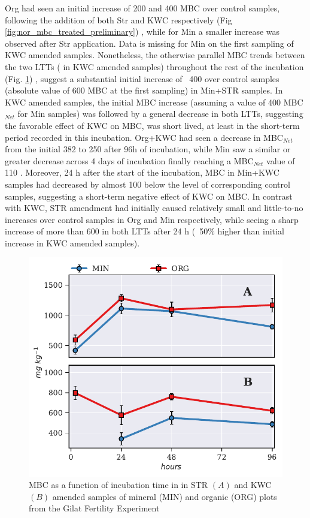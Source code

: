             \noindent Org had seen an initial increase of 200 and 400 \genericunit MBC over control samples, following the addition of both Str and KWC respectively (Fig \ref{fig:nor_mbc_treated_preliminary}) , while for Min a smaller increase was observed after Str application. Data is missing for Min on the first sampling of KWC  amended samples. Nonetheless, the otherwise parallel MBC trends between the two LTTs ( in KWC amended samples) throughout the rest of the incubation (Fig. \ref{fig:mbc_treated_preliminary}) , suggest a substantial initial increase of ~400 \genericunit over control samples (absolute value of 600 \genericunit MBC at the first sampling)  in Min+STR samples.
            In KWC amended samples, the initial MBC increase (assuming a value of 400 \genericunit MBC$_{Net}$ for Min samples) was followed by a general decrease in both LTTs, suggesting the favorable effect of KWC on MBC,  was short lived, at least in the short-term period recorded in this incubation. Org+KWC had seen a decrease in MBC$_{Net}$ from the initial 382 to 250 \genericunit after 96h of incubation, while Min saw a similar or greater decrease across 4 days of incubation finally reaching a MBC$_{Net}$ value of  110 \genericunit. Moreover, 24 h after the start of the incubation, MBC in Min+KWC samples had decreased by almost 100 \genericunit below the level of corresponding control samples,  suggesting a short-term negative effect of KWC on MBC. In contrast with KWC, STR amendment had initially caused relatively small and little-to-no increases over control samples in Org and Min respectively, while seeing a sharp increase of more than 600 \genericunit in both LTTs after 24 h (~50$\%$ higher than initial increase in KWC amended samples).\\

			\begin{figure}[H]
				\centering
				\includegraphics[width=\linewidth]{thesis_figures/preliminary/treated/MBC.pdf}
				\caption{MBC  as a function of incubation time in in STR $\left(A\right)$ and KWC $\left(B\right)$ amended samples of mineral (MIN) and organic (ORG) plots from the Gilat Fertility Experiment}
				\label{fig:mbc_treated_preliminary}
			\end{figure}

